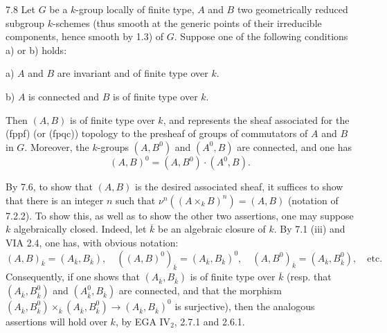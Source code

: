 \begin{proposition}{7.8}\label{VIB.7.8}
Let $G$ be a $k$-group locally of finite type, $A$ and $B$ two geometrically reduced subgroup $k$-schemes (thus smooth at the generic points of their irreducible components, hence smooth by 1.3) of $G$. Suppose one of the following conditions a) or b) holds:

a) $A$ and $B$ are invariant and of finite type over $k$.

b) $A$ is connected and $B$ is of finite type over $k$.

Then $(A,B)$ is of finite type over $k$, and represents the sheaf associated for the (fppf) (or (fpqc)) topology to the presheaf of groups of commutators of $A$ and $B$ in $G$. Moreover, the $k$-groups $(A,B^0)$ and $(A^0,B)$ are connected, and one has
\[
(A,B)^0=(A,B^0)\cdot(A^0,B).
\]
\end{proposition}
By 7.6, to show that $(A,B)$ is the desired associated sheaf, it suffices to show that there is an integer $n$ such that $\nu^n((A\times_k B)^n)=(A,B)$ (notation of 7.2.2). To show this, as well as to show the other two assertions, one may suppose $k$ algebraically closed. Indeed, let $\overline{k}$ be an algebraic closure of $k$. By 7.1 (iii) and VIA 2.4, one has, with obvious notation:
\[
(A,B)_{\overline{k}}=(A_{\overline{k}},B_{\overline{k}}),\quad ((A,B)^0)_{\overline{k}}=(A_{\overline{k}},B_{\overline{k}})^0,\quad (A,B^0)_{\overline{k}}=(A_{\overline{k}},B_{\overline{k}}^0),\quad\text{etc.}
\]
Consequently, if one shows that $(A_{\overline{k}},B_{\overline{k}})$ is of finite type over $\overline{k}$ (resp. that $(A_{\overline{k}},B_{\overline{k}}^0)$ and $(A_{\overline{k}}^0,B_{\overline{k}})$ are connected, and that the morphism $(A_{\overline{k}},B_{\overline{k}}^0)\times_{\overline{k}}(A_{\overline{k}},B_{\overline{k}}^0)\to(A_{\overline{k}},B_{\overline{k}})^0$ is surjective), then the analogous assertions will hold over $k$, by EGA IV$_2$, 2.7.1 and 2.6.1.

